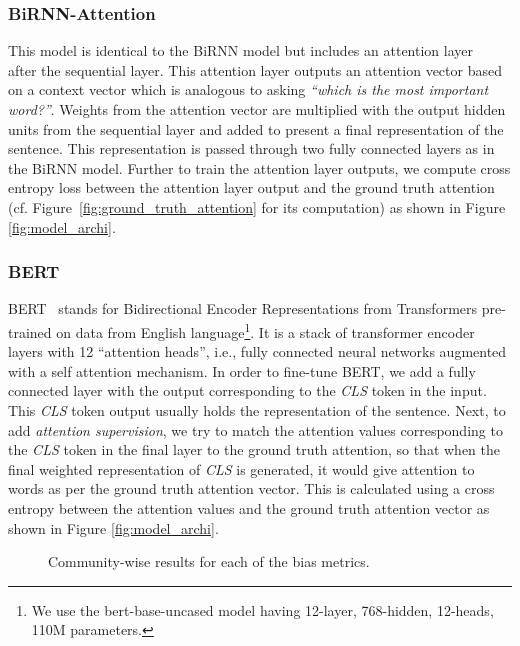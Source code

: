 \documentclass[letterpaper]{article} \usepackage{aaai21}  \usepackage{times}  \usepackage{helvet} \usepackage{courier}  \usepackage[hyphens]{url}  \usepackage{graphicx} \urlstyle{rm} \def\UrlFont{\rm}  \usepackage{natbib}  \usepackage{caption}
\begin{document}
\subsubsection{BiRNN-Attention} 
This model is identical to the BiRNN model but includes an attention layer~\cite{liu2016attention} after the sequential layer. This attention layer outputs an attention vector based on a context vector which is analogous to asking \textit{``which is the most important word?''}. Weights from the attention vector are multiplied with the output hidden units from the sequential layer and added to present a final representation of the sentence. This representation is passed through two fully connected layers as in the BiRNN model. Further to train the attention layer outputs, 
we compute cross entropy loss between the attention layer output and the ground truth attention (cf. Figure~\ref{fig:ground_truth_attention} for its computation) as shown in Figure \ref{fig:model_archi}. 




\subsubsection{BERT} BERT~\cite{devlin2019bert} stands for Bidirectional Encoder Representations from Transformers pre-trained on data from English language\footnote{We use the bert-base-uncased model having 12-layer, 768-hidden, 12-heads, 110M parameters.}. It is a stack of transformer encoder layers with 12 ``attention heads'', i.e., fully connected neural networks augmented with a self attention mechanism. In order to fine-tune BERT, we add a fully connected layer with the output corresponding to the \textit{CLS} token in the input. 
This \textit{CLS} token output usually holds the representation of the sentence. Next, to add \textit{attention supervision}, we try to match the attention values corresponding to the \textit{CLS} token in the final layer to the ground truth attention, so that when the final weighted representation of \textit{CLS} is generated, it would give attention to words as per the ground truth attention vector. This is calculated using a cross entropy between the attention values and the ground truth attention vector as shown in Figure \ref{fig:model_archi}.






\begin{figure*}[!tbh]\centering
    \caption{Community-wise results for each of the bias metrics.}\label{fig:bias_community_wise}\end{figure*}
\end{document}
